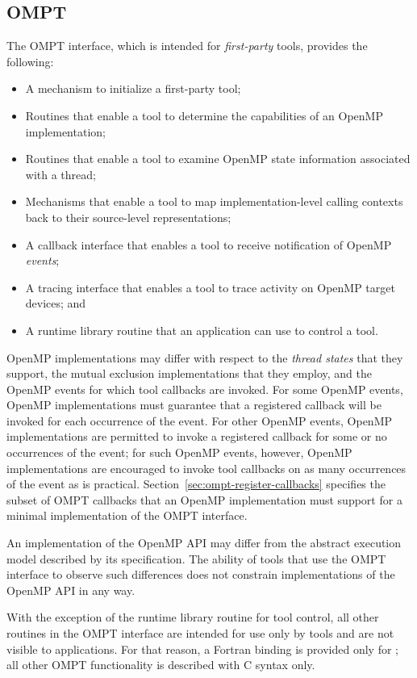 \subsection{OMPT}

The OMPT interface, which is intended for \emph{first-party} tools,
provides the following:
\begin{itemize}
\item A mechanism to initialize a first-party tool;
\item Routines that enable a tool to determine the capabilities of an
      OpenMP implementation;
\item Routines that enable a tool to examine OpenMP state information 
      associated with a thread;
\item Mechanisms that enable a tool to map implementation-level calling
      contexts back to their source-level representations;
\item A callback interface that enables a tool to receive notification
      of OpenMP \emph{events};
\item A tracing interface that enables a tool to trace activity on OpenMP 
      target devices; and
\item A runtime library routine that an application can use to control a tool.
\end{itemize}

OpenMP implementations may differ with respect to the \emph{thread states} that
they support, the mutual exclusion implementations that they employ,
and the OpenMP events for which tool callbacks are invoked. For some OpenMP events,
OpenMP implementations must guarantee that a registered callback will be invoked 
for each occurrence of the event. For other OpenMP events, OpenMP implementations 
are permitted to invoke a registered callback for some or no occurrences of the 
event; for such OpenMP events, however, OpenMP implementations are encouraged to 
invoke tool callbacks on as many occurrences of the event as is practical.
Section~\ref{sec:ompt-register-callbacks} specifies the subset of OMPT
callbacks that an OpenMP implementation must support for a minimal
implementation of the OMPT interface.

An implementation of the OpenMP API may differ from the
abstract execution model described by its specification.  The ability
of tools that use the OMPT interface to observe such differences does 
not constrain implementations of the OpenMP API in any way.

With the exception of the  runtime library routine for tool control,
all other routines in the OMPT interface are intended for use only by tools and
are not visible to applications.
For that reason, a Fortran binding is provided only
for ;
all other OMPT functionality is described with C syntax only.

